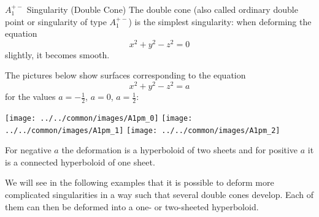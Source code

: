 \begin{surferPage}[A1+- Singularity]{$A^{+-}_1$ Singularity (Double Cone)}
	The double cone (also called ordinary double point or singularity of type $A_1^{+-}$) is the simplest singularity: when deforming the equation
	\[x^2+y^2-z^2=0\]
	slightly, it becomes smooth.

	The pictures below show surfaces corresponding to the equation
	\[x^2+y^2-z^2=a\]
	for the values $a=-\frac12$, $a=0$, $a=\frac12$:
	\begin{center}
		\texttt{[image: ../../common/images/A1pm\_0]}\quad%
		\texttt{[image: ../../common/images/A1pm\_1]}\quad%
		\texttt{[image: ../../common/images/A1pm\_2]}%
	\end{center}
	\vspace{-0.2cm}
	For negative $a$ the deformation is a hyperboloid of two sheets and for positive $a$ it is a connected hyperboloid of one sheet.

	We will see in the following examples that it is possible to deform more
	complicated singularities in a way such that several double cones develop. Each of them can then be deformed into a one- or two-sheeted hyperboloid.
\end{surferPage}
